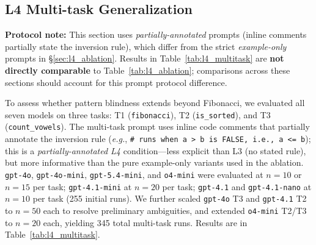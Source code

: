 \subsection{L4 Multi-task Generalization}
\label{sec:l4_multitask}
\textbf{Protocol note:} This section uses \emph{partially-annotated} prompts (inline comments partially state the inversion rule), which differ from the strict \emph{example-only} prompts in \S\ref{sec:l4_ablation}. Results in Table~\ref{tab:l4_multitask} are \textbf{not directly comparable} to Table~\ref{tab:l4_ablation}; comparisons across these sections should account for this prompt protocol difference.

To assess whether pattern blindness extends beyond Fibonacci, we evaluated all seven models on three tasks: T1 (\texttt{fibonacci}), T2 (\texttt{is\_sorted}), and T3 (\texttt{count\_vowels}). The multi-task prompt uses inline code comments that partially annotate the inversion rule (\textit{e.g.}, \texttt{\# runs when a > b is FALSE, i.e., a <= b}); this is a \emph{partially-annotated L4} condition---less explicit than L3 (no stated rule), but more informative than the pure example-only variants used in the ablation. \texttt{gpt-4o}, \texttt{gpt-4o-mini}, \texttt{gpt-5.4-mini}, and \texttt{o4-mini} were evaluated at $n=10$ or $n=15$ per task; \texttt{gpt-4.1-mini} at $n=20$ per task; \texttt{gpt-4.1} and \texttt{gpt-4.1-nano} at $n=10$ per task (255 initial runs). We further scaled \texttt{gpt-4o} T3 and \texttt{gpt-4.1} T2 to $n=50$ each to resolve preliminary ambiguities, and extended \texttt{o4-mini} T2/T3 to $n=20$ each, yielding 345 total multi-task runs. Results are in Table~\ref{tab:l4_multitask}.

